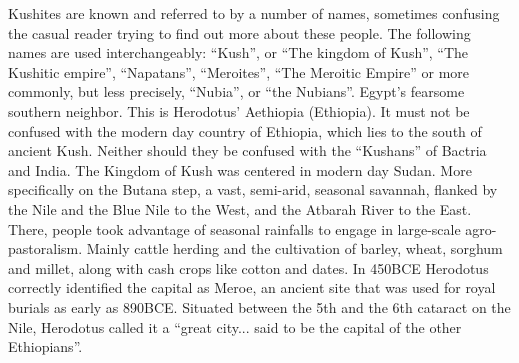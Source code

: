 \documentclass[a4paper,12pt]{scrreprt}
\begin{document}
Kushites are known and referred to by a number of names, sometimes confusing the casual reader trying to find out more about these people. The following names are used interchangeably: “Kush”, or “The kingdom of Kush”, “The Kushitic empire”, “Napatans”, “Meroites”, “The Meroitic Empire” or more commonly, but less precisely, “Nubia”, or “the Nubians”. Egypt’s fearsome southern neighbor. This is Herodotus’ Aethiopia (Ethiopia). It must not be confused with the modern day country of Ethiopia, which lies to the south of ancient Kush. Neither should they be confused with the “Kushans” of Bactria and India. The Kingdom of Kush was centered in modern day Sudan. More specifically on the Butana step, a vast, semi-arid, seasonal savannah, flanked by the Nile and the Blue Nile to the West, and the Atbarah River to the East. There, people took advantage of seasonal rainfalls to engage in large-scale agro-pastoralism. Mainly cattle herding and the cultivation of barley, wheat, sorghum and millet, along with cash crops like cotton and dates. In 450BCE Herodotus correctly identified the capital as Meroe, an ancient site that was used for royal burials as early as 890BCE. Situated between the 5th and the 6th cataract on the Nile, Herodotus called it a “great city... said to be the capital of the other Ethiopians”.
\end{document}
